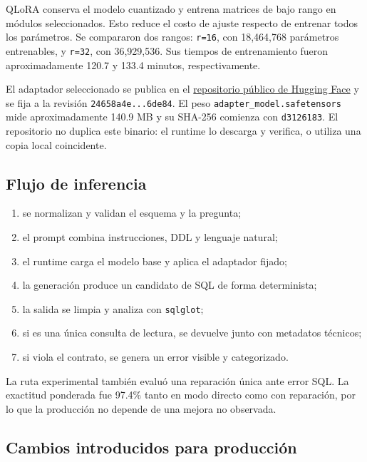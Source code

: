 \documentclass[11pt,letterpaper]{article}
\newcommand{\code}[1]{\texttt{#1}}
\begin{document}
QLoRA conserva el modelo cuantizado y entrena matrices de bajo rango en módulos seleccionados. Esto
reduce el costo de ajuste respecto de entrenar todos los parámetros. Se compararon dos rangos:
\code{r=16}, con 18,464,768 parámetros entrenables, y \code{r=32}, con 36,929,536. Sus tiempos de
entrenamiento fueron aproximadamente 120.7 y 133.4 minutos, respectivamente.

El adaptador seleccionado se publica en el
\href{https://huggingface.co/Dani0604/proyecto3-text2sql-qlora}{repositorio público de Hugging Face}
y se fija a la revisión
\code{24658a4e...6de84}. El peso \code{adapter\_model.safetensors} mide aproximadamente 140.9 MB y
su SHA-256 comienza con \code{d3126183}. El repositorio no duplica este binario: el runtime lo
descarga y verifica, o utiliza una copia local coincidente.

\subsection{Flujo de inferencia}

\begin{enumerate}
  \item se normalizan y validan el esquema y la pregunta;
  \item el prompt combina instrucciones, DDL y lenguaje natural;
  \item el runtime carga el modelo base y aplica el adaptador fijado;
  \item la generación produce un candidato de SQL de forma determinista;
  \item la salida se limpia y analiza con \code{sqlglot};
  \item si es una única consulta de lectura, se devuelve junto con metadatos técnicos;
  \item si viola el contrato, se genera un error visible y categorizado.
\end{enumerate}

La ruta experimental también evaluó una reparación única ante error SQL. La exactitud ponderada fue
97.4\% tanto en modo directo como con reparación, por lo que la producción no depende de una mejora
no observada.

\subsection{Cambios introducidos para producción}
\end{document}
